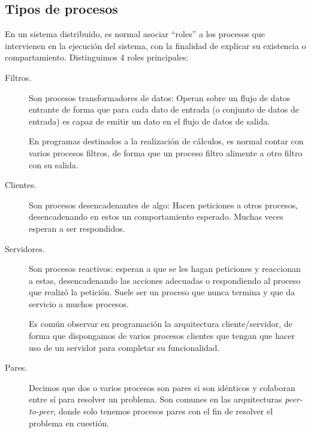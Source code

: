 \subsection{Tipos de procesos}
En un sistema distribuido, es normal asociar ``roles'' a los procesos que intervienen en la ejecución del sistema, con la finalidad de explicar su existencia o compartamiento. Distinguimos 4 roles principales:
\begin{description}
    \item [Filtros.] Son procesos transformadores de datos: Operan sobre un flujo de datos entrante de forma que para cada dato de entrada (o conjunto de datos de entrada) es capaz de emitir un dato en el flujo de datos de salida.

        En programas destinados a la realización de cálculos, es normal contar con varios procesos filtros, de forma que un proceso filtro alimente a otro filtro con su salida.
    \item [Clientes.] Son procesos desencadenantes de algo: Hacen peticiones a otros procesos, desencadenando en estos un comportamiento esperado. Muchas veces esperan a ser respondidos.
    \item [Servidores.] Son procesos reactivos: esperan a que se les hagan peticiones y reaccionan a estas, desencadenando las acciones adecuadas o respondiendo al proceso que realizó la petición. Suele ser un proceso que nunca termina y que da servicio a muchos procesos.

        Es común observar en programación la arquitectura cliente/servidor, de forma que dispongamos de varios procesos clientes que tengan que hacer uso de un servidor para completar su funcionalidad.
    \item [Pares.] Decimos que dos o varios procesos son pares si son idénticos y colaboran entre sí para resolver un problema. Son comunes en las arquitecturas \textit{peer-to-peer}, donde solo tenemos procesos pares con el fin de resolver el problema en cuestión.
\end{description}


